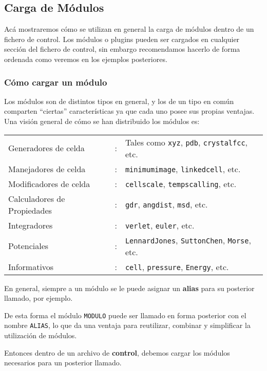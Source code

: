 \subsection{Carga de M\'odulos}

Ac\'a mostraremos c\'omo se utilizan en general la carga de m\'odulos dentro de un fichero de control. Los m\'odulos o plugins pueden ser cargados en cualquier secci\'on del fichero de control, sin embargo recomendamos hacerlo de forma ordenada como veremos en los ejemplos posteriores.

\subsubsection{C\'omo cargar un m\'odulo}

Los m\'odulos son de distintos tipos en general, y los de un tipo en com\'un comparten ``ciertas'' caracter\'isticas ya que cada uno posee sus propias ventajas. Una visi\'on general de c\'omo se han distribuido los m\'odulos es: 

\begin{tabular}{lcl}
 Generadores de celda & : & Tales como \verb|xyz|, \verb|pdb|, \verb|crystalfcc|, etc. \\
 Manejadores de celda & : &\verb|minimumimage|, \verb|linkedcell|, etc. \\
 Modificadores de celda & : &\verb|cellscale|, \verb|tempscalling|, etc.\\
 Calculadores de Propiedades & : & \verb|gdr|, \verb|angdist|, \verb|msd|, etc. \\
 Integradores & : & \verb|verlet|, \verb|euler|, etc. \\
 Potenciales & : & \verb|LennardJones|, \verb|SuttonChen|, \verb|Morse|, etc. \\
 Informativos & : & \verb|cell|, \verb|pressure|, \verb|Energy|, etc.
\end{tabular}

En general, siempre a un m\'odulo se le puede asignar un \textbf{alias} para su posterior llamado, por ejemplo.


De esta forma el m\'odulo \texttt{MODULO} puede ser llamado en forma posterior con el nombre \texttt{ALIAS}, lo que da una ventaja para reutilizar, combinar y simplificar la utilizaci\'on de m\'odulos.

Entonces dentro de un archivo de \textbf{control}, debemos cargar los m\'odulos necesarios para un posterior llamado.


